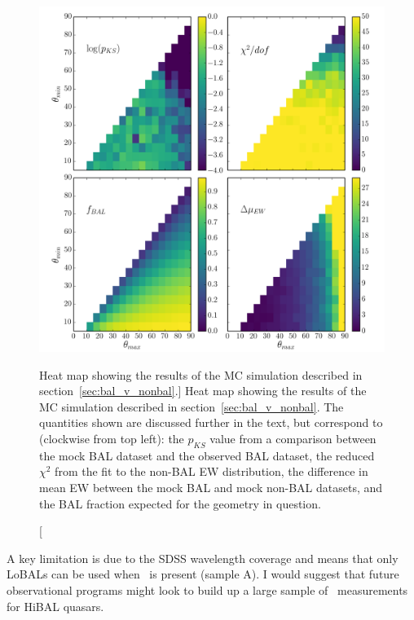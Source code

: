 \begin{figure} %
\centering
\includegraphics[width=1.0\textwidth]{figures/ewpaper/mesh4_ew_o3_max_sdss.png}
\caption
[Heat map showing the results of the MC simulation described in 
section~\ref{sec:bal_v_nonbal}.]
{
Heat map showing the results of the MC simulation described in 
section~\ref{sec:bal_v_nonbal}. The quantities shown are discussed 
further in the text, but correspond to (clockwise from top left):
the $p_{KS}$ value from a comparison between the mock BAL dataset
and the observed BAL dataset, the reduced $\chi^2$ from the fit to
the non-BAL EW distribution, the difference in mean EW between the 
mock BAL and mock non-BAL datasets, and the BAL fraction expected
for the geometry in question.
}
\label{fig:contour}
\end{figure} %

A key limitation is due to the SDSS wavelength coverage
and means that only LoBALs can be used when \ewo\ is present (sample A).
I would suggest that future observational programs might 
look to build up a large sample of \ewo\ measurements for HiBAL
quasars. 










